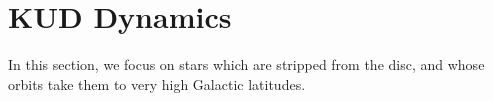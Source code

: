 






\section{KUD Dynamics} \label{sec:kud}
In this section, we focus on stars which are stripped from the disc, and whose orbits take them to very high Galactic latitudes.

